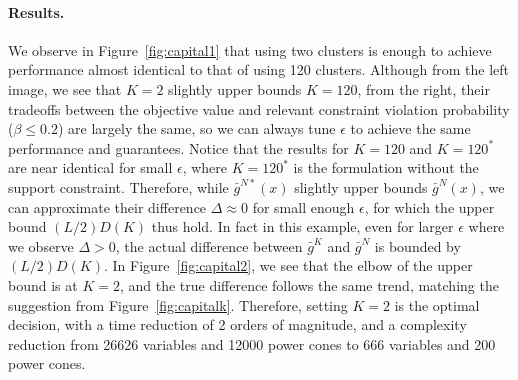\documentclass[12pt]{article}
\theoremstyle{thmstyleone}%
\theoremstyle{thmstyletwo}%
\theoremstyle{thmstylethree}%
\newcommand{\reviewChanges}{}
\begin{document}
\paragraph{Results.}  We observe in Figure~\ref{fig:capital1} that using two clusters is enough to achieve performance almost identical to that of using 120 clusters.
Although from the left image, we see that $K=2$ slightly upper bounds $K = 120$, from the right, their tradeoffs between the objective value and relevant constraint violation probability ($\beta \leq 0.2$) are largely the same, so we can always tune $\epsilon$ to achieve the same performance and guarantees.
Notice that the results for $K = 120$ and $K=120^*$ are near identical for small $\epsilon$, where $K=120^*$ is the formulation without the support constraint. Therefore, while $ \bar{g}^{N*}(x)$ slightly upper bounds $\bar{g}^N(x)$, we can approximate their difference $\Delta \approx 0$ for small enough $\epsilon$, for which the upper bound $(L/2)D(K)$ thus hold.
In fact in this example, even for larger $\epsilon$ where we observe $\Delta > 0$, the actual difference between $\bar{g}^K$ and $\bar{g}^N$ is bounded by $(L/2)D(K)$.
\reviewChanges{
In Figure~\ref{fig:capital2}, we see that the elbow of the upper bound is at $K = 2$, and the true difference follows the same trend, matching the suggestion from Figure~\ref{fig:capitalk}.}
Therefore, setting $K = 2$ is the optimal decision, with a time reduction of 2 orders of magnitude, and a complexity reduction from 26626 variables and 12000 power cones to 666 variables and 200 power cones.
\end{document}
